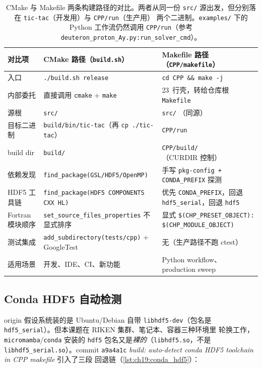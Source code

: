 \begin{table}[t]
\centering
\small
\begin{tabular}{@{}p{30mm}p{52mm}p{52mm}@{}}
\toprule
\textbf{对比项} & \textbf{CMake 路径}（\texttt{build.sh}） & \textbf{Makefile 路径}（\texttt{CPP/makefile}）\\
\midrule
入口 & \texttt{./build.sh release} & \texttt{cd CPP \&\& make -j} \\
内部委托 & 直接调用 \texttt{cmake} + \texttt{make} & 23~行壳，转给仓库根 \texttt{Makefile} \\
源根 & \texttt{src/} & \texttt{src/} （同源） \\
目标二进制 & \texttt{build/bin/tic-tac}（再 \texttt{cp ./tic-tac}） & \texttt{CPP/run} \\
build dir & \texttt{build/} & \texttt{CPP/build/}（CURDIR 控制） \\
依赖发现 & \texttt{find\_package(GSL/HDF5/OpenMP)} & 手写 \texttt{pkg-config + CONDA\_PREFIX} 探测 \\
HDF5 工具链 & \texttt{find\_package(HDF5 COMPONENTS CXX HL)} & 优先 \texttt{CONDA\_PREFIX}，回退 \texttt{hdf5\_serial}，回退 \texttt{hdf5} \\
Fortran 模块顺序 & \texttt{set\_source\_files\_properties} 不显式排序 & 显式 \texttt{\$(CHP\_PRESET\_OBJECT): \$(CHP\_MODULE\_OBJECT)} \\
测试集成 & \texttt{add\_subdirectory(tests/cpp)} + GoogleTest & 无（生产路径不跑 ctest） \\
适用场景 & 开发、IDE、CI、新功能 & Python workflow、production sweep \\
\bottomrule
\end{tabular}
\caption{CMake 与 Makefile 两条构建路径的对比。两者从同一份 \texttt{src/}
源出发，但分别落在 \texttt{tic-tac}（开发用）与 \texttt{CPP/run}（生产用）
两个二进制。\texttt{examples/} 下的 Python 工作流仍然调用
\texttt{CPP/run}（参考 \texttt{deuteron\_proton\_Ay.py:run\_solver\_cmd}）。}
\label{tab:ch19:build_compare}
\end{table}

\subsection{Conda HDF5 自动检测}

origin 假设系统装的是 Ubuntu/Debian 自带 \texttt{libhdf5-dev}（包名是
\texttt{hdf5\_serial}）。但本课题在 RIKEN 集群、笔记本、容器三种环境里
轮换工作，\texttt{micromamba}/\texttt{conda} 安装的 \texttt{hdf5}
包名又是\emph{裸的}（\texttt{libhdf5.so}，不是
\texttt{libhdf5\_serial.so}）。commit \texttt{a9a4a1c}
\emph{build: auto-detect conda HDF5 toolchain in CPP makefile} 引入了三段
回退链（\cref{lst:ch19:conda_hdf5}）：

